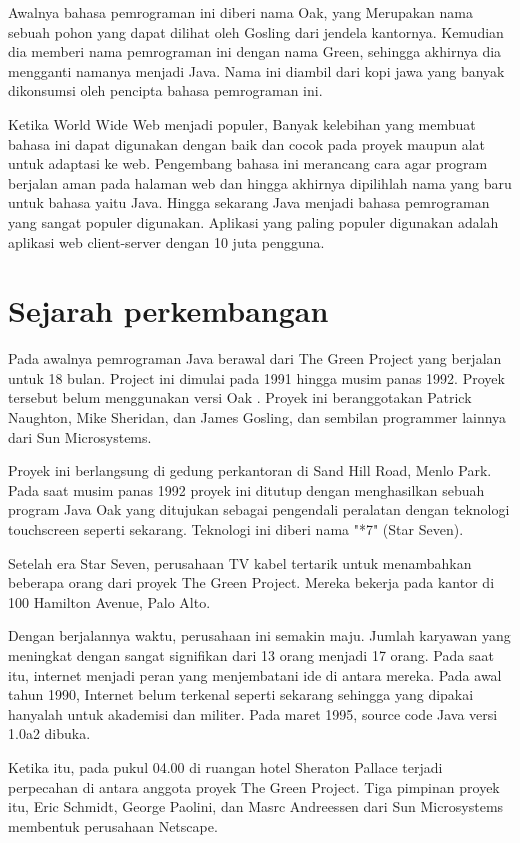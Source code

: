 Awalnya bahasa pemrograman ini diberi nama Oak, yang Merupakan nama sebuah pohon yang dapat dilihat oleh Gosling dari jendela kantornya. Kemudian dia memberi nama pemrograman ini dengan nama Green,  sehingga akhirnya dia mengganti namanya menjadi Java. Nama ini diambil dari kopi jawa yang banyak dikonsumsi oleh pencipta bahasa pemrograman ini. 

Ketika World Wide Web menjadi populer, Banyak kelebihan yang membuat bahasa ini dapat digunakan dengan baik dan cocok pada proyek maupun alat untuk adaptasi ke web. Pengembang bahasa ini merancang cara agar program berjalan aman pada halaman web dan hingga akhirnya dipilihlah nama yang baru untuk bahasa yaitu Java. Hingga sekarang Java menjadi bahasa pemrograman yang sangat populer digunakan. Aplikasi yang paling populer digunakan adalah aplikasi web client-server dengan 10 juta pengguna.

\section{Sejarah perkembangan}
Pada awalnya pemrograman Java berawal dari The Green Project yang berjalan untuk 18 bulan. Project ini dimulai pada 1991 hingga musim panas 1992. Proyek tersebut belum menggunakan versi Oak .  Proyek ini beranggotakan Patrick Naughton, Mike Sheridan, dan James Gosling, dan sembilan programmer lainnya dari Sun Microsystems.

Proyek ini berlangsung di gedung perkantoran di Sand Hill Road, Menlo Park. Pada saat musim panas 1992 proyek ini ditutup dengan menghasilkan sebuah program Java Oak yang ditujukan sebagai pengendali peralatan dengan teknologi touchscreen seperti sekarang. Teknologi ini diberi nama "*7" (Star Seven).

Setelah era Star Seven, perusahaan TV kabel tertarik untuk menambahkan beberapa orang dari proyek The Green Project. Mereka bekerja pada kantor di 100 Hamilton Avenue, Palo Alto. 

Dengan berjalannya waktu, perusahaan ini semakin maju. Jumlah karyawan yang meningkat dengan sangat signifikan dari 13 orang menjadi 17 orang. Pada saat itu, internet menjadi peran yang menjembatani ide di antara mereka. Pada awal tahun 1990, Internet belum terkenal seperti sekarang sehingga yang dipakai hanyalah untuk akademisi dan militer. Pada maret 1995, source code Java versi 1.0a2 dibuka. 

Ketika itu, pada pukul 04.00 di ruangan hotel Sheraton Pallace terjadi perpecahan di antara anggota proyek The Green Project. Tiga pimpinan proyek itu, Eric Schmidt, George Paolini, dan Masrc Andreessen dari Sun Microsystems membentuk perusahaan Netscape.

